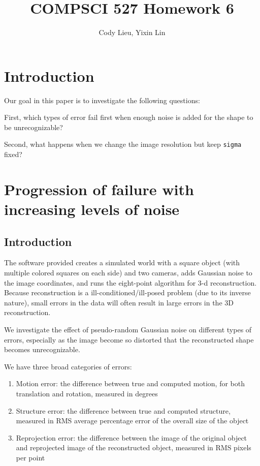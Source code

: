 \documentclass{article}
\author{Cody Lieu, Yixin Lin}
\title{COMPSCI 527 Homework 6}
\begin{document}
\maketitle

% 


\section{Introduction}

Our goal in this paper is to investigate the following questions:

First, which types of error fail first when enough noise is added for the shape to be unrecognizable?

Second, what happens when we change the image resolution but keep \texttt{sigma} fixed?

\newpage
\section{Progression of failure with increasing levels of noise}

\subsection{Introduction}

The software provided creates a simulated world with a square object (with multiple colored squares on each side) and two cameras, adds Gaussian noise to the image coordinates, and runs the eight-point algorithm for 3-d reconstruction. Because reconstruction is a ill-conditioned/ill-posed problem (due to its inverse nature), small errors in the data will often result in large errors in the 3D reconstruction. 

We investigate the effect of pseudo-random Gaussian noise on different types of errors, especially as the image become so distorted that the reconstructed shape becomes unrecognizable.

We have three broad categories of errors:

\begin{enumerate}
  \item Motion error: the difference between true and computed motion, for both translation and rotation, measured in degrees
  \item Structure error: the difference between true and computed structure, measured in RMS average percentage error of the overall size of the object
  \item Reprojection error: the difference between the image of the original object and reprojected image of the reconstructed object, measured in RMS pixels per point
\end{enumerate} 
\end{document}
